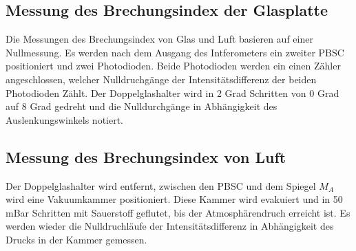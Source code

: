 \subsection{Messung des Brechungsindex der Glasplatte}
Die Messungen des Brechungsindex von Glas und Luft basieren auf einer Nullmessung. Es werden nach dem Ausgang des Intferometers ein zweiter PBSC positioniert und zwei Photodioden.
Beide Photodioden werden ein einen Zähler angeschlossen, welcher Nulldruchgänge der Intensitätsdifferenz der beiden Photodioden Zählt. Der Doppelglashalter wird
in 2 Grad Schritten von 0 Grad auf 8 Grad gedreht und die Nulldurchgänge in Abhängigkeit des Auslenkungswinkels notiert.

\subsection{Messung des Brechungsindex von Luft}
Der Doppelglashalter wird entfernt, zwischen den PBSC und dem Spiegel $M_A$ wird eine Vakuumkammer positioniert. Diese Kammer wird evakuiert und in 50 mBar Schritten
mit Sauerstoff geflutet, bis der Atmosphärendruch erreicht ist. Es werden wieder die Nulldruchläufe der Intensitätsdifferenz in Abhängigkeit des
Drucks in der Kammer gemessen.
